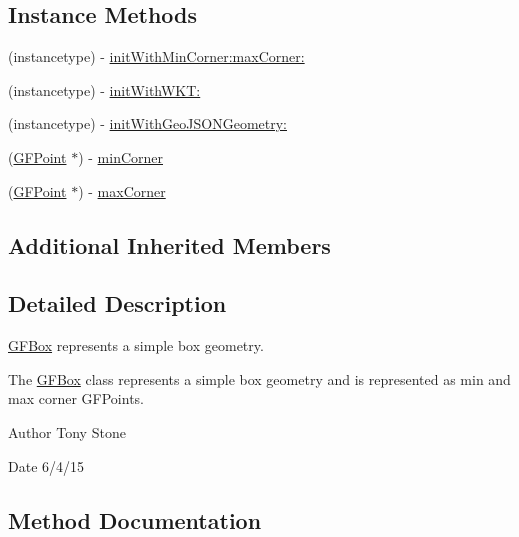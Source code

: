 \subsection*{Instance Methods}
\begin{DoxyCompactItemize}
\item 
(instancetype) -\/ \hyperlink{interface_g_f_box_a87bf50c9385711b4fed6c5ec9552397e}{init\+With\+Min\+Corner\+:max\+Corner\+:}
\item 
(instancetype) -\/ \hyperlink{interface_g_f_box_ab1c15e82e6b01e415e5fad629ac34ca4}{init\+With\+W\+K\+T\+:}
\item 
(instancetype) -\/ \hyperlink{interface_g_f_box_a4865745ca621d9ee91186301d1bee3b3}{init\+With\+Geo\+J\+S\+O\+N\+Geometry\+:}
\item 
(\hyperlink{interface_g_f_point}{G\+F\+Point} $\ast$) -\/ \hyperlink{interface_g_f_box_a102f7c53d4871e5431e813a2cb43eccd}{min\+Corner}
\item 
(\hyperlink{interface_g_f_point}{G\+F\+Point} $\ast$) -\/ \hyperlink{interface_g_f_box_ac2926a7b4f4f826f769a6f59aecd6f64}{max\+Corner}
\end{DoxyCompactItemize}
\subsection*{Additional Inherited Members}


\subsection{Detailed Description}
\hyperlink{interface_g_f_box}{G\+F\+Box} represents a simple box geometry. 

The \hyperlink{interface_g_f_box}{G\+F\+Box} class represents a simple box geometry and is represented as min and max corner G\+F\+Points.

\begin{DoxyAuthor}{Author}
Tony Stone 
\end{DoxyAuthor}
\begin{DoxyDate}{Date}
6/4/15 
\end{DoxyDate}


\subsection{Method Documentation}
\hypertarget{interface_g_f_box_a87bf50c9385711b4fed6c5ec9552397e}{}
